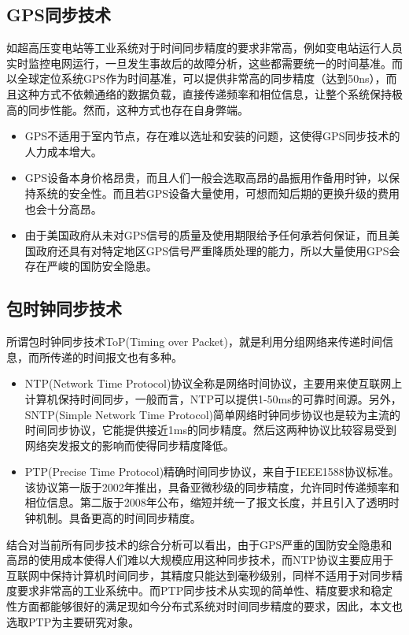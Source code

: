 \subsection{GPS同步技术}
如超高压变电站等工业系统对于时间同步精度的要求非常高，例如变电站运行人员实时监控电网运行，一旦发生事故后的故障分析，这些都需要统一的时间基准。而以全球定位系统GPS作为时间基准，可以提供非常高的同步精度（达到50ns），而且这种方式不依赖通络的数据负载，直接传递频率和相位信息，让整个系统保持极高的同步性能。然而，这种方式也存在自身弊端。
\begin{itemize}[noitemsep,topsep=0pt,parsep=0pt,partopsep=0pt]
	\item GPS不适用于室内节点，存在难以选址和安装的问题，这使得GPS同步技术的人力成本增大。
	\item GPS设备本身价格昂贵，而且人们一般会选取高昂的晶振用作备用时钟，以保持系统的安全性。而且若GPS设备大量使用，可想而知后期的更换升级的费用也会十分高昂。
	\item 由于美国政府从未对GPS信号的质量及使用期限给予任何承若何保证，而且美国政府还具有对特定地区GPS信号严重降质处理的能力，所以大量使用GPS会存在严峻的国防安全隐患。
\end{itemize}

\subsection{包时钟同步技术}
所谓包时钟同步技术ToP(Timing over Packet)，就是利用分组网络来传递时间信息，而所传递的时间报文也有多种。
\begin{itemize}[noitemsep,topsep=0pt,parsep=0pt,partopsep=0pt]
	\item  NTP(Network Time Protocol)协议全称是网络时间协议，主要用来使互联网上计算机保持时间同步，一般而言，NTP可以提供1-50ms的可靠时间源。另外，SNTP(Simple Network Time Protocol)简单网络时钟同步协议也是较为主流的时间同步协议，它能提供接近1ms的同步精度。然后这两种协议比较容易受到网络突发报文的影响而使得同步精度降低。
	\item PTP(Precise Time Protocol)精确时间同步协议，来自于IEEE1588协议标准。该协议第一版于2002年推出，具备亚微秒级的同步精度，允许同时传递频率和相位信息。第二版于2008年公布，缩短并统一了报文长度，并且引入了透明时钟机制。具备更高的时间同步精度。
\end{itemize}

结合对当前所有同步技术的综合分析可以看出，由于GPS严重的国防安全隐患和高昂的使用成本使得人们难以大规模应用这种同步技术，而NTP协议主要应用于互联网中保持计算机时间同步，其精度只能达到毫秒级别，同样不适用于对同步精度要求非常高的工业系统中。而PTP同步技术从实现的简单性、精度要求和稳定性方面都能够很好的满足现如今分布式系统对时间同步精度的要求，因此，本文也选取PTP为主要研究对象。

